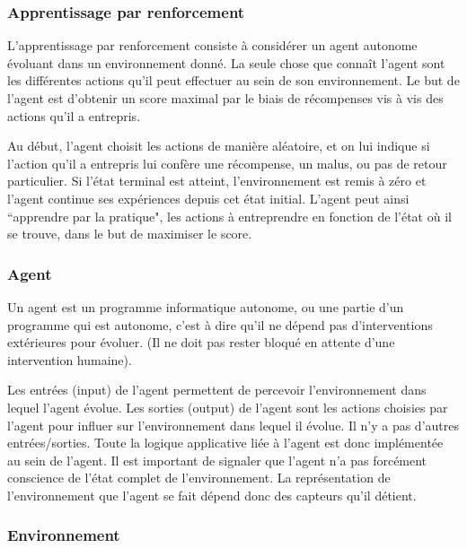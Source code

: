 \documentclass[11pt,a4paper]{report}
\begin{document}
  \subsubsection{Apprentissage par renforcement}  
  
    \par L'apprentissage par renforcement consiste à considérer un agent autonome évoluant dans un environnement donné. La seule chose que connaît l'agent sont les différentes actions qu'il peut effectuer au sein de son environnement. Le but de l'agent est d'obtenir un score maximal par le biais de récompenses vis à vis des actions qu'il a entrepris.
    
    \par Au début, l'agent choisit les actions de manière aléatoire, et on lui indique si l'action qu'il a entrepris lui confère une récompense, un malus, ou pas de retour particulier. Si l'état terminal est atteint, l'environnement est remis à zéro et l'agent continue ses expériences depuis cet état initial. L'agent peut ainsi ``apprendre par la pratique", les actions à entreprendre en fonction de l'état où il se trouve, dans le but de maximiser le score.
  
  \subsubsection{Agent}
  
    \par Un agent est un programme informatique autonome, ou une partie d'un programme qui est autonome, c'est à dire qu'il ne dépend pas d'interventions extérieures pour évoluer. (Il ne doit pas rester bloqué en attente d'une intervention humaine). 
    
    \par Les entrées (input) de l'agent permettent de percevoir l'environnement dans lequel l'agent évolue. Les sorties (output) de l'agent sont les actions choisies par l'agent pour influer sur l'environnement dans lequel il évolue. Il n'y a pas d'autres entrées/sorties. Toute la logique applicative liée à l'agent est donc implémentée au sein de l'agent. Il est important de signaler que l'agent n'a pas forcément conscience de l'état complet de l'environnement. La représentation de l'environnement que l'agent se fait dépend donc des capteurs qu'il détient. 
   
  \subsubsection{Environnement}
  
\end{document}
